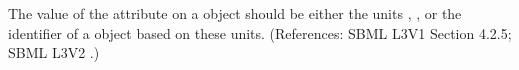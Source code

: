 The value of the attribute  on a \Model object should be
either the units , , or the identifier of a
\UnitDefinition object based on these units.  (References: SBML L3V1 Section 4.2.5; SBML L3V2
.)
